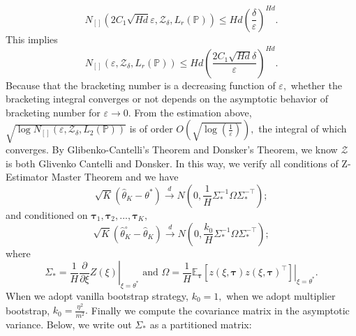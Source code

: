 \documentclass{article}
\numberwithin{equation}{section}
\theoremstyle{plain}
\theoremstyle{definition}
\theoremstyle{remark}
\begin{document}
    \begin{equation*}
        N_{[]}\left(2 C_1 \sqrt{Hd} \varepsilon, \mathcal{Z}_{\delta}, L_r(\mathbb{P})\right) \leq Hd \left(\frac{\delta}{\varepsilon}\right)^{Hd}.
    \end{equation*}
    This implies 
    \begin{equation}\label{bracketing_num_result}
        N_{[]}\left(\varepsilon, \mathcal{Z}_{\delta}, L_r(\mathbb{P})\right) \leq Hd \left(\frac{2 C_1 \sqrt{Hd} \delta}{\varepsilon}\right)^{Hd}.
    \end{equation}
    Because that the bracketing number is a decreasing function of $\varepsilon,$ whether the bracketing integral converges or not depends on the asymptotic behavior of bracketing number for $\varepsilon \to 0.$ From the estimation above, $\sqrt{\log N_{[]} (\varepsilon,\mathcal{Z}_{\delta},L_2(\mathbb{P}))}$ is of order $O(\sqrt{\log(\frac{1}{\varepsilon})}),$ the integral of which converges. By Glibenko-Cantelli's Theorem and Donsker's Theorem, we know $\mathcal{Z}$ is both Glivenko Cantelli and Donsker. In this way, we verify all conditions of Z-Estimator Master Theorem and we have
        \begin{equation}\label{finite_normal_convergence1}
        \sqrt{K}\left(\widehat{\theta}_K - \theta^*\right) \stackrel{d}{\longrightarrow} N\left(0,\frac{1}{H} \Sigma^{-1}_* \Omega \Sigma^{-\top}_*\right);
    \end{equation}
    and conditioned on $\boldsymbol{\tau}_1,\boldsymbol{\tau}_2,...,\boldsymbol{\tau}_K,$
    \begin{equation}\label{finite_normal_convergence_bootstrapping}
        \sqrt{K}\left(\widehat{\theta}^{\circ}_K - \widehat{\theta}_K\right) \stackrel{d}{\longrightarrow} N\left(0,\frac{k_0}{H} \Sigma^{-1}_* \Omega \Sigma^{-\top}_*\right);
    \end{equation}
    where 
    \begin{equation}\label{definiton_Sigma_and_Omega}
        \Sigma_* = \frac{1}{H} \left.\frac{\partial}{\partial \xi} Z\left(\xi\right)\right|_{\xi = \theta^*} \text{ and }
        \Omega = \frac{1}{H} \left.\mathbb{E}_{\boldsymbol{\tau}} \left[z(\xi,\boldsymbol{\tau}) z(\xi,\boldsymbol{\tau})^{\top}\right]\right|_{\xi = \theta^*}.
    \end{equation}
    When we adopt vanilla bootstrap strategy, $k_0 = 1,$ when we adopt multiplier bootstrap, $k_0 = \frac{\eta^2}{m^2}.$ Finally we compute the covariance matrix in the asymptotic variance. Below, we write out $\Sigma_*$ as a partitioned matrix:
\end{document}
